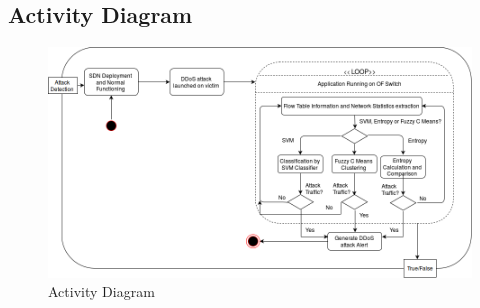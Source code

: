 \documentclass[12pt,a4paper,final]{report}
\begin{document}
\subsection{Activity Diagram}
\begin{figure}[h]
\begin{center}
\includegraphics[scale=0.5]{activity.png}
\caption{Activity Diagram}
\end{center}
\end{figure}
\end{document}
